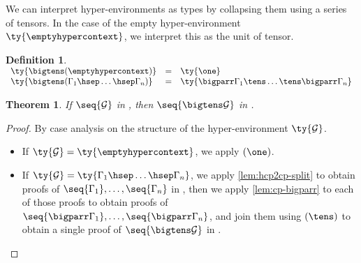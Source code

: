 \documentclass[submission,copyright,creativecommons]{eptcs}
\newtheorem{definition}{Definition}
\newtheorem{theorem}{Theorem}
\begin{document}
We can interpret hyper-environments as types by collapsing them using a series
of tensors. In the case of the empty hyper-environment
$\ty{\emptyhypercontext}$, we interpret this as the unit of tensor.
\begin{definition}\label{def:bigtens}
  \(
  \begin{array}{lcl}
    \ty{\bigtens(\emptyhypercontext)}
    & = & \ty{\one}
    \\
    \ty{\bigtens(\Gamma_1 \hsep \dots \hsep \Gamma_n)}
    & = & \ty{\bigparr\Gamma_1 \tens \dots \tens \bigparr\Gamma_n}
  \end{array}
  \)
\end{definition}

\begin{theorem}\label{thm:hcp2cp-bigtens}
  If $\seq{\mathcal{G}}$ in \hcp, then $\seq{\bigtens\mathcal{G}}$ in \cp.
\end{theorem}
\begin{proof}
  By case analysis on the structure of the hyper-environment $\ty{\mathcal{G}}$.
  \begin{itemize}
  \item
    If $\ty{\mathcal{G}} = \ty{\emptyhypercontext}$, we apply $(\one)$.
  \item
    If $\ty{\mathcal{G}} = \ty{\Gamma_1 \hsep \dots \hsep \Gamma_n}$,
    we apply \cref{lem:hcp2cp-split} to obtain proofs of $\seq{\Gamma_1}, \dots,
    \seq{\Gamma_n}$ in \cp, then we apply \cref{lem:cp-bigparr} to each of
    those proofs to obtain proofs of $\seq{\bigparr\Gamma_1}, \dots,
    \seq{\bigparr\Gamma_n}$, and join them using $(\tens)$ to obtain a single
    proof of $\seq{\bigtens\mathcal{G}}$ in \cp.
  \end{itemize}
\end{proof}




\end{document}
